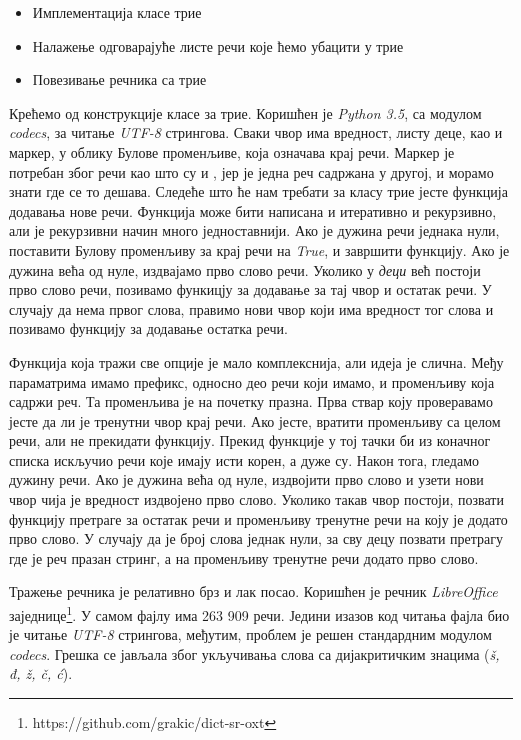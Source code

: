 \documentclass[11pt, oneside, a4paper]{article}
\begin{document}
\begin{itemize}
    \item Имплементација класе трие
    \item Налажење одговарајуће листе речи које ћемо убацити у трие
    \item Повезивање речника са трие
\end{itemize}
Крећемо од конструкције класе за трие. Коришћен је \textit{Python 3.5}, са модулом \textit{codecs}, за читање \textit{UTF-8} стрингова. Сваки чвор има вредност, листу деце, као и маркер, у облику Булове променљиве, која означава крај речи. Маркер је потребан због речи као што су \grqq{} и \grqq, јер је једна реч садржана у другој, и морамо знати где се то дешава.
Следеће што ће нам требати за класу трие јесте функција додавања нове речи. Функција може бити написана и итеративно и рекурзивно, али је рекурзивни начин много једноставнији. Ако је дужина речи једнака нули, поставити Булову променљиву за крај речи на \textit{True}, и завршити функцију. Ако је дужина већа од нуле, издвајамо прво слово речи. Уколико у \textit{деци} већ постоји прво слово речи, позивамо функицју за додавање за тај чвор и остатак речи. У случају да нема првог слова, правимо нови чвор који има вредност тог слова и позивамо функцију за додавање остатка речи. \par
Функција која тражи све опције је мало комплекснија, али идеја је слична. Међу параматрима имамо префикс, односно део речи који имамо, и променљиву која садржи  \grqq{}  реч. Та променљива је на почетку празна. Прва ствар коју проверавамо јесте да ли је тренутни чвор крај речи. Ако јесте, вратити променљиву са целом речи, али не прекидати функцију. Прекид функције у тој тачки би из коначног списка искључио речи које имају исти корен, а дуже су. Након тога, гледамо дужину речи. Ако је дужина већа од нуле, издвојити прво слово и узети нови чвор чија је вредност издвојено прво слово. Уколико такав чвор постоји, позвати функцију претраге за остатак речи и променљиву тренутне речи на коју је додато прво слово. У случају да је број слова једнак нули, за сву децу позвати претрагу где је реч празан стринг, а на променљиву тренутне речи додато прво слово. \par
Тражење речника је релативно брз и лак посао. Коришћен је речник \textit{LibreOffice} заједнице\footnote{https://github.com/grakic/dict-sr-oxt}. У самом фајлу има 263 909 речи. Једини изазов код читања фајла био је читање \textit{UTF-8} стрингова, међутим, проблем је решен стандардним модулом \textit{codecs}. Грешка се јављала због укључивања слова са дијакритичким знацима (\textit{š, đ, ž, č, ć}). \par
\end{document}
